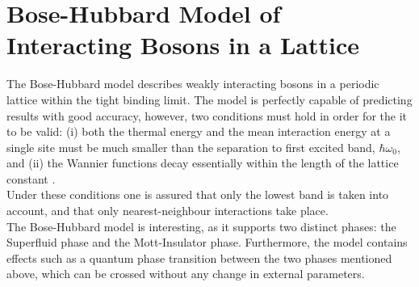 \chapter{Bose-Hubbard Model of Interacting Bosons in a Lattice}
The Bose-Hubbard model describes weakly interacting bosons in a periodic lattice within the tight binding limit. The model is perfectly capable of predicting results with good accuracy, however, two conditions must hold in order for the it to be valid: (i) both the thermal energy and the mean interaction energy at a single site must be much smaller than the separation to first excited band, $\hbar \omega_0$, and (ii) the Wannier functions decay essentially within the length of the lattice constant \cite{manybodyBloch}.\\
Under these conditions one is assured that only the lowest band is taken into account, and that only nearest-neighbour interactions take place.\\
The Bose-Hubbard model is interesting, as it supports two distinct phases: the Superfluid phase and the Mott-Insulator phase. Furthermore, the model contains effects such as a quantum phase transition between the two phases mentioned above, which can be crossed without any change in external parameters. 


